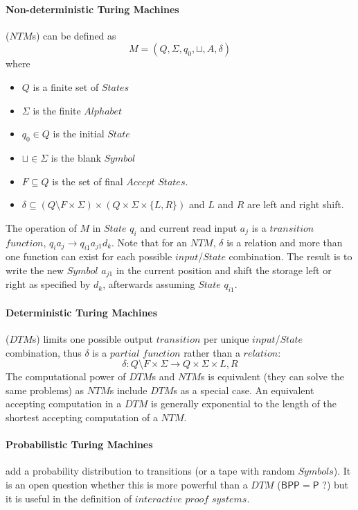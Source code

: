 \documentclass{article}
\begin{document}
    \paragraph{Non-deterministic Turing Machines} ($NTM$s) can be defined
    as
        \[
            M = (Q, \Sigma, q_0, \sqcup, A, \delta)
        \]
    where
    \begin{itemize}
    \item $Q$ is a finite set of $States$
    \item $\Sigma$ is the finite $Alphabet$
    \item $q_0 \in Q$ is the initial $State$
    \item $\sqcup \in \Sigma$ is the blank $Symbol$
    \item $F \subseteq Q$ is the set of final $Accept$ $States$.
    \item $\delta \subseteq (Q \setminus F \times \Sigma) \times (Q \times
      \Sigma \times \{L,R\})$ and $L$ and $R$ are left and right shift.
    \end{itemize}
    The operation of $M$ in $State$ $q_i$ and current read input $a_j$
    is a $transition$ $function$, $q_i a_j \rightarrow q_{i1} a_{j1}
    d_k$. Note that for an $NTM$, $\delta$ is a relation and more than
    one function can exist for each possible $input$/$State$
    combination. The result is to write the new $Symbol$ $a_{j1}$ in
    the current position and shift the storage left or right as
    specified by $d_k$, afterwards assuming $State$ $q_{i1}$.

    \paragraph{Deterministic Turing Machines} ($DTM$s) limits one possible
    output $transition$ per unique $input$/$State$ combination, thus
    $\delta$ is a $partial$ $function$ rather than a $relation$:
    \[
        \delta : Q \setminus F \times \Sigma \rightarrow Q \times
        \Sigma \times {L,R}
    \]
    The computational power of $DTM$s and $NTM$s is equivalent (they
    can solve the same problems) as $NTM$s include $DTM$s as a special
    case. An equivalent accepting computation in a $DTM$ is generally
    exponential to the length of the shortest accepting computation of
    a $NTM$.

    \paragraph{Probabilistic Turing Machines} add a probability
    distribution to transitions (or a tape with random $Symbols$). It
    is an open question whether this is more powerful than a $DTM$
    ($\mathsf{BPP}=\mathsf{P}$ ?) but it is useful in the definition of
    $interactive$ $proof$ $systems$.
\end{document}
